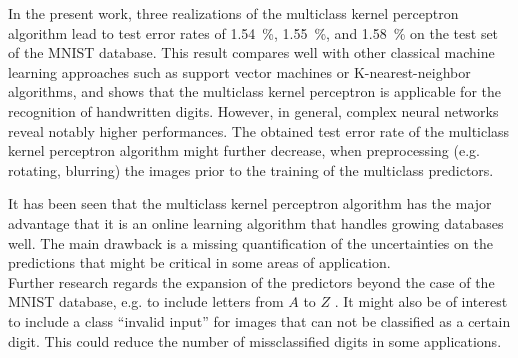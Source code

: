 In the present work, three realizations of the multiclass kernel perceptron algorithm lead to test error rates of \SI{1.54}{\percent}, \SI{1.55}{\percent}, and \SI{1.58}{\percent} on the test set of the MNIST database. This result compares well with other classical machine learning approaches such as support vector machines or K-nearest-neighbor algorithms, and shows that the multiclass kernel perceptron is applicable for the recognition of handwritten digits. However, in general, complex neural networks reveal notably higher performances. The obtained test error rate of the multiclass kernel perceptron algorithm might further decrease, when preprocessing (e.g. rotating, blurring) the images prior to the training of the multiclass predictors. 

It has been seen that the multiclass kernel perceptron algorithm has the major advantage that it is an online learning algorithm that handles growing databases well. The main drawback is a missing quantification of the uncertainties on the predictions that might be critical in some areas of application.\\

Further research regards the expansion of the predictors beyond the case of the MNIST database, e.g. to include letters from $A$ to $Z$ \cite{EMNIST2017}. It might also be of interest to include a class \enquote{invalid input} for images that can not be classified as a certain digit. This could reduce the number of missclassified digits in some applications.